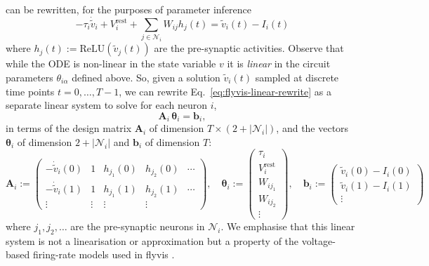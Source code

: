 \documentclass{article}
\def\vrest{V^{\mathrm{rest}}}
\def\relu{\mathrm{ReLU}}
\begin{document}
 can be rewritten, for the purposes of parameter inference
\begin{equation}
    -\tau_i \dot{\tilde{v}}_i + \vrest_i + \sum_{j \in \mathcal{N}_i} W_{ij}h_j(t) = \tilde{v}_i(t) - I_i(t)
    \label{eq:flyvis-linear-rewrite}
\end{equation}
where $h_j(t) := \relu(\tilde{v}_j(t))$ are the pre-synaptic activities.
Observe that while the ODE is non-linear in the state variable $v$ it is
\emph{linear} in the circuit parameters $\theta_{i\alpha}$ defined above. So,
given a solution $\tilde{v}_i(t)$ sampled at discrete time points $t=0,
\ldots, T-1$, we can rewrite Eq.~\ref{eq:flyvis-linear-rewrite} as a separate
linear system to solve for each neuron $i$,
\begin{equation}
    \mathbf{A}_i \, \boldsymbol{\theta}_i = \mathbf{b}_i,
    \label{eq:parameter-linear-system}
\end{equation}
in terms of the design matrix $\mathbf{A}_i$ of dimension $T \times (2 + |\mathcal{N}_i|)$,
and the vectors $\boldsymbol{\theta}_i$ of dimension $2 + |\mathcal{N}_i|$ and
$\mathbf{b}_i$ of dimension $T$:
\begin{equation}
    \mathbf{A}_i := \begin{pmatrix}
        -\dot{\tilde{v}}_i(0) & 1 & h_{j_1}(0) & h_{j_2}(0) & \cdots  \\
        -\dot{\tilde{v}}_i(1) & 1 & h_{j_1}(1) & h_{j_2}(1) & \cdots  \\
        \vdots & \vdots & \vdots & \vdots &
    \end{pmatrix},\quad
    \boldsymbol{\theta}_i := \begin{pmatrix}
        \tau_i \\ \vrest_i \\ W_{ij_1} \\ W_{ij_2} \\ \vdots
    \end{pmatrix},\quad
    \mathbf{b}_i := \begin{pmatrix}
        \tilde{v}_i(0) - I_i(0) \\
        \tilde{v}_i(1) - I_i(1) \\
        \vdots
    \end{pmatrix}
    \label{eq:explicit-linear-system}
\end{equation}
where $j_1, j_2, \ldots$ are the pre-synaptic neurons in $\mathcal{N}_i$.
We emphasise that this linear system is not a linearisation or approximation
but a property of the voltage-based firing-rate models used in flyvis
\citep{Lappalainen2024-tq}.
\end{document}
